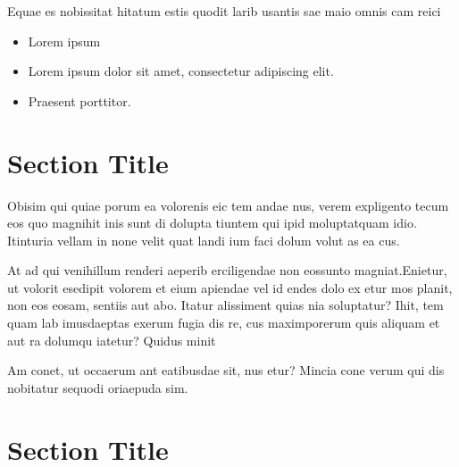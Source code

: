\documentclass[
]{ImperialPoster}
\begin{document}
\begin{multicols}{3}
	
	Equae es nobissitat hitatum estis quodit larib usantis sae maio omnis cam reici
	
	
	\begin{itemize}
		\item Lorem ipsum
		\item Lorem ipsum dolor sit amet, consectetur adipiscing elit.
		\item Praesent porttitor.
	\end{itemize}
	
	\columnbreak %
	
	
	\section{Section Title}
	
	{
		\small %
		Obisim qui quiae porum ea volorenis eic tem andae nus, verem expligento tecum eos quo magnihit inis sunt di dolupta tiuntem qui ipid moluptatquam idio. Itinturia vellam in none velit quat landi ium faci dolum volut as ea cus.

		At ad qui venihillum renderi aeperib erciligendae non eossunto magniat.Enietur, ut volorit esedipit volorem et eium apiendae vel id endes dolo ex etur mos planit, non eos eosam, sentiis aut abo. Itatur alissiment quias nia soluptatur? Ihit, tem quam lab imusdaeptas exerum fugia dis re, cus maximporerum quis aliquam et aut ra dolumqu iatetur? Quidus minit

		Am conet, ut occaerum ant eatibusdae sit, nus etur? Mincia cone verum qui dis nobitatur sequodi oriaepuda sim.\par
	}
	
	\vspace{0.405\textheight} %
	
	\section{Section Title}
	

\end{multicols}
\end{document}
